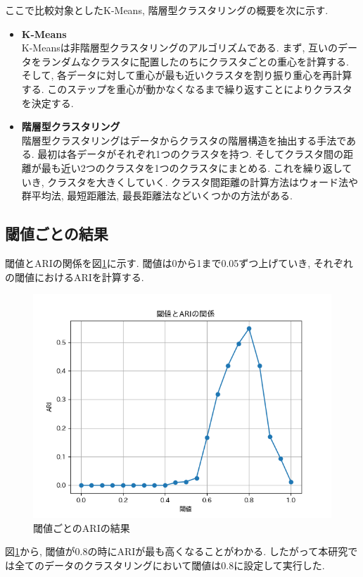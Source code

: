 ここで比較対象としたK-Means, 階層型クラスタリングの概要を次に示す. 

\begin{itemize}
  \item \textbf{K-Means}\\
  K-Meansは非階層型クラスタリングのアルゴリズムである. まず, 互いのデータをランダムなクラスタに配置したのちにクラスタごとの重心を計算する. そして, 各データに対して重心が最も近いクラスタを割り振り重心を再計算する. このステップを重心が動かなくなるまで繰り返すことによりクラスタを決定する. 

  \item \textbf{階層型クラスタリング}\\
  階層型クラスタリングはデータからクラスタの階層構造を抽出する手法である. 最初は各データがそれぞれ1つのクラスタを持つ. そしてクラスタ間の距離が最も近い2つのクラスタを1つのクラスタにまとめる. これを繰り返していき, クラスタを大きくしていく. クラスタ間距離の計算方法はウォード法や群平均法, 最短距離法, 最長距離法などいくつかの方法がある. 
\end{itemize}

\subsection{閾値ごとの結果}
閾値とARIの関係を図\ref{fig:cw_graph}に示す. 閾値は0から1まで0.05ずつ上げていき, それぞれの閾値におけるARIを計算する. 

\begin{figure}[H]
  \centering
  \includegraphics[scale=0.8]
    {contents/images/cw_graph.png}
  \caption{閾値ごとのARIの結果\label{fig:cw_graph}}
\end{figure}
図\ref{fig:cw_graph}から, 閾値が0.8の時にARIが最も高くなることがわかる. したがって本研究では全てのデータのクラスタリングにおいて閾値は0.8に設定して実行した.

